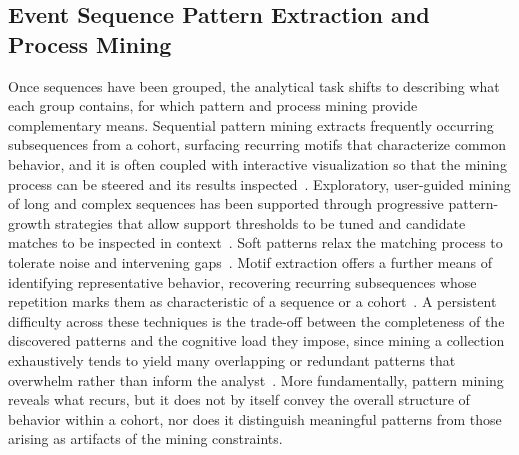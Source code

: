 \subsection{Event Sequence Pattern Extraction and Process Mining}

Once sequences have been grouped, the analytical task shifts to describing what each group contains, for which pattern and process mining provide complementary means.
Sequential pattern mining extracts frequently occurring subsequences from a cohort, surfacing recurring motifs that characterize common behavior, and it is often coupled with interactive visualization so that the mining process can be steered and its results inspected~\cite{guo2022survey}.
Exploratory, user-guided mining of long and complex sequences has been supported through progressive pattern-growth strategies that allow support thresholds to be tuned and candidate matches to be inspected in context~\cite{vrotsou2019exploratory, vrotsou2020window}.
Soft patterns relax the matching process to tolerate noise and intervening gaps~\cite{gotz2016soft}.
Motif extraction offers a further means of identifying representative behavior, recovering recurring subsequences whose repetition marks them as characteristic of a sequence or a cohort~\cite{patel2002mining, liu2005locating}.
A persistent difficulty across these techniques is the trade-off between the completeness of the discovered patterns and the cognitive load they impose, since mining a collection exhaustively tends to yield many overlapping or redundant patterns that overwhelm rather than inform the analyst~\cite{du2017coping, guo2022survey}.
More fundamentally, pattern mining reveals what recurs, but it does not by itself convey the overall structure of behavior within a cohort, nor does it distinguish meaningful patterns from those arising as artifacts of the mining constraints.

